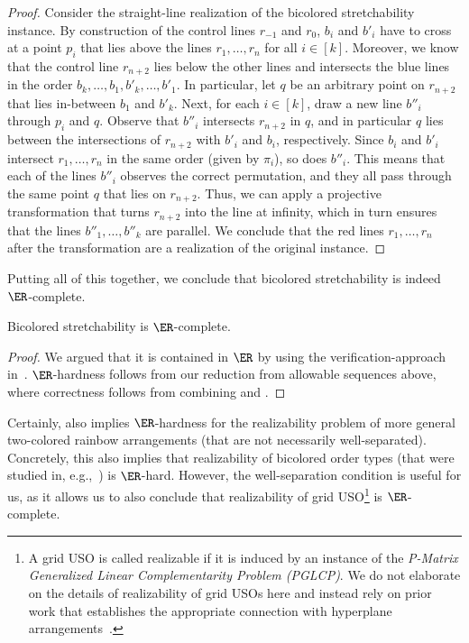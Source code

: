 \begin{proof}
    Consider the straight-line realization of the bicolored stretchability instance. By construction of the control lines $r_{-1}$ and $r_0$, $b_i$ and $b'_i$ have to cross at a point $p_i$ that lies above the lines $r_1, \dots, r_n$ for all $i \in [k]$. Moreover, we know that the control line $r_{n + 2}$ lies below the other lines and intersects the blue lines in the order $b_k, \dots, b_1, b'_k, \dots, b'_1$. In particular, let $q$ be an arbitrary point on $r_{n + 2}$ that lies in-between $b_1$ and $b'_k$. 
%
    Next, for each $i \in [k]$, draw a new line $b''_i$ through $p_i$ and $q$. Observe that $b''_i$ intersects $r_{n + 2}$ in $q$, and in particular $q$ lies between the intersections of $r_{n + 2}$ with $b'_i$ and $b_i$, respectively. Since $b_i$ and $b'_i$ intersect $r_1, \dots, r_n$ in the same order (given by $\pi_i$), so does $b''_i$. This means that each of the lines $b''_i$ observes the correct permutation, and they all pass through the same point $q$ that lies on $r_{n + 2}$. Thus, we can apply a projective transformation that turns $r_{n + 2}$ into the line at infinity, which in turn ensures that the lines $b''_1, \dots, b''_k$ are parallel. We conclude that the red lines $r_1, \dots, r_n$ after the transformation are a realization of the original \AS instance.   
\end{proof}
%
Putting all of this together, we conclude that bicolored stretchability is indeed $\ER$-complete. 
%
\begin{theorem}
\label{theorem:er-hardness}
    Bicolored stretchability is $\ER$-complete.
\end{theorem}
\begin{proof}
    We argued that it is contained in $\ER$ by using the verification-approach in~\cite{ericksonSmoothingGapNP2024}. $\ER$-hardness follows from our reduction from allowable sequences above, where correctness follows from combining  and .
\end{proof}
%
Certainly,  also implies $\ER$-hardness for the realizability problem of more general two-colored rainbow arrangements (that are not necessarily well-separated). Concretely, this also implies that realizability of bicolored order types (that were studied in, e.g.,~\cite{aichholzerBicoloredOrderTypes2024}) is $\ER$-hard. However, the well-separation condition is useful for us, as it allows us to also conclude that realizability of grid USO\footnote{A grid USO is called realizable if it is induced by an instance of the \emph{P-Matrix Generalized Linear Complementarity Problem (PGLCP)}. We do not elaborate on the details of realizability of grid USOs here and instead rely on prior work that establishes the appropriate connection with hyperplane arrangements~\cite{borzechowskiTwoChoicesAre2024}.} is $\ER$-complete.
